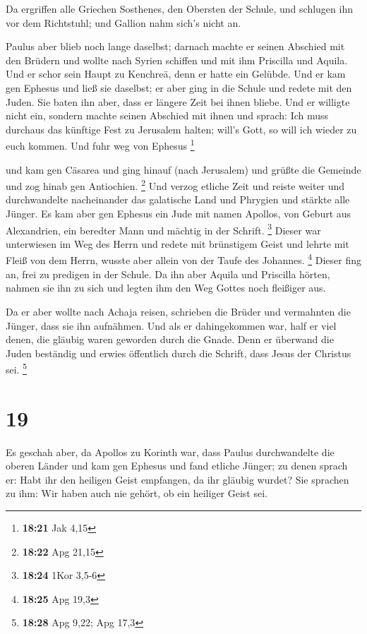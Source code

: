  Da ergriffen alle Griechen Sosthenes, den Obersten der
Schule, und schlugen ihn vor dem Richtstuhl; und Gallion nahm sich's
nicht an.

 Paulus aber blieb noch lange daselbst; darnach machte er
seinen Abschied mit den Brüdern und wollte nach Syrien schiffen und mit
ihm Priscilla und Aquila. Und er schor sein Haupt zu Kenchreä, denn er
hatte ein Gelübde.  Und er kam gen Ephesus und ließ sie
daselbst; er aber ging in die Schule und redete mit den Juden.
 Sie baten ihn aber, dass er längere Zeit bei ihnen
bliebe. Und er willigte nicht ein,  sondern machte seinen
Abschied mit ihnen und sprach: Ich muss durchaus das künftige Fest zu
Jerusalem halten; will's Gott, so will ich wieder zu euch kommen. Und
fuhr weg von Ephesus \footnote{\textbf{18:21} Jak 4,15}

 und kam gen Cäsarea und ging hinauf (nach Jerusalem) und
grüßte die Gemeinde und zog hinab gen Antiochien. \footnote{\textbf{18:22}
  Apg 21,15}  Und verzog etliche Zeit und reiste weiter
und durchwandelte nacheinander das galatische Land und Phrygien und
stärkte alle Jünger.  Es kam aber gen Ephesus ein Jude
mit namen Apollos, von Geburt aus Alexandrien, ein beredter Mann und
mächtig in der Schrift. \footnote{\textbf{18:24} 1Kor 3,5-6}
 Dieser war unterwiesen im Weg des Herrn und redete mit
brünstigem Geist und lehrte mit Fleiß von dem Herrn, wusste aber allein
von der Taufe des Johannes. \footnote{\textbf{18:25} Apg 19,3}
 Dieser fing an, frei zu predigen in der Schule. Da ihn
aber Aquila und Priscilla hörten, nahmen sie ihn zu sich und legten ihm
den Weg Gottes noch fleißiger aus.

 Da er aber wollte nach Achaja reisen, schrieben die
Brüder und vermahnten die Jünger, dass sie ihn aufnähmen. Und als er
dahingekommen war, half er viel denen, die gläubig waren geworden durch
die Gnade.  Denn er überwand die Juden beständig und
erwies öffentlich durch die Schrift, dass Jesus der Christus sei.
\footnote{\textbf{18:28} Apg 9,22; Apg 17,3}

\hypertarget{section-5}{%
\section{19}\label{section-5}}

 Es geschah aber, da Apollos zu Korinth war, dass Paulus
durchwandelte die oberen Länder und kam gen Ephesus und fand etliche
Jünger;  zu denen sprach er: Habt ihr den heiligen Geist
empfangen, da ihr gläubig wurdet? Sie sprachen zu ihm: Wir haben auch
nie gehört, ob ein heiliger Geist sei.

